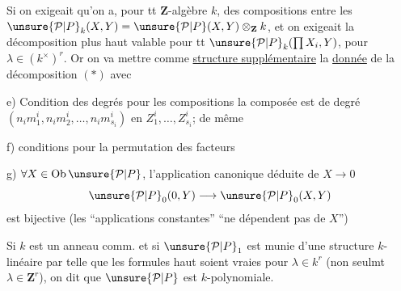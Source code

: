 
Si on exigeait qu'on a, pour tt $\mathbf Z$-algèbre $k$, des compositions entre les $\unsure{\mathcal P|P}_k(X,Y)=\unsure{\mathcal P|P}(X,Y)\otimes_{\mathbf Z}k$, et on exigeait la décomposition plus haut valable pour tt $\unsure{\mathcal P|P}_k(\prod X_i,Y)$, pour $\lambda\in(k^\times)^r$. Or on va mettre comme \uline{structure supplémentaire} la \uline{donnée} de la décomposition $(*)$ avec

e) Condition des degrés pour les compositions
la composée est de degré $(n_i m_1^i,n_i m_2^i,\ldots,n_i m_{s_i}^i)$ en $Z_1^i,\ldots,Z_{s_i}^i$; de même

f) conditions  pour la permutation des facteurs

g) $\forall X\in\operatorname{Ob}\unsure{\mathcal P|P}$, l'application canonique déduite de $X\longrightarrow0$
\[
\unsure{\mathcal P|P}_0(0,Y)\longrightarrow \unsure{\mathcal P|P}_0(X,Y)
\]
est bijective (les ``applications constantes''  ``ne dépendent pas de $X$'')

Si $k$ est un anneau comm. et si $\unsure{\mathcal P|P}_1$ est munie d'une structure $k$-linéaire par
 telle que les formules haut soient vraies pour $\lambda\in k^r$ (non seulmt $\lambda\in\mathbf Z^r$), on dit que $\unsure{\mathcal P|P}$ est $k$-polynomiale.

